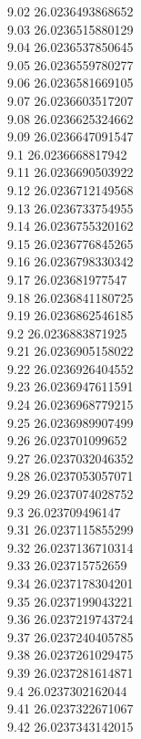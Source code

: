 {9.02	26.0236493868652\\
9.03	26.0236515880129\\
9.04	26.0236537850645\\
9.05	26.0236559780277\\
9.06	26.0236581669105\\
9.07	26.0236603517207\\
9.08	26.0236625324662\\
9.09	26.0236647091547\\
9.1	26.0236668817942\\
9.11	26.0236690503922\\
9.12	26.0236712149568\\
9.13	26.0236733754955\\
9.14	26.0236755320162\\
9.15	26.0236776845265\\
9.16	26.0236798330342\\
9.17	26.023681977547\\
9.18	26.0236841180725\\
9.19	26.0236862546185\\
9.2	26.0236883871925\\
9.21	26.0236905158022\\
9.22	26.0236926404552\\
9.23	26.0236947611591\\
9.24	26.0236968779215\\
9.25	26.0236989907499\\
9.26	26.023701099652\\
9.27	26.0237032046352\\
9.28	26.0237053057071\\
9.29	26.0237074028752\\
9.3	26.023709496147\\
9.31	26.0237115855299\\
9.32	26.0237136710314\\
9.33	26.023715752659\\
9.34	26.0237178304201\\
9.35	26.0237199043221\\
9.36	26.0237219743724\\
9.37	26.0237240405785\\
9.38	26.0237261029475\\
9.39	26.0237281614871\\
9.4	26.0237302162044\\
9.41	26.0237322671067\\
9.42	26.0237343142015\\
}
